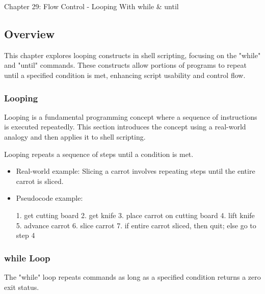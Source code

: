 \begin{notes}{Chapter 29: Flow Control - Looping With while \& until}
    \subsection*{Overview}

    This chapter explores looping constructs in shell scripting, focusing on the "while" and "until" commands. These constructs allow portions of programs to repeat until a specified condition is met, 
    enhancing script usability and control flow.
    
    \subsubsection*{Looping}
    
    Looping is a fundamental programming concept where a sequence of instructions is executed repeatedly. This section introduces the concept using a real-world analogy and then applies it to shell scripting.
    
    \begin{highlight}[Looping]
    
        Looping repeats a sequence of steps until a condition is met.
        
        \begin{itemize}
            \item Real-world example: Slicing a carrot involves repeating steps until the entire carrot is sliced.
            \item Pseudocode example:
    \begin{code}[Bash]
    1. get cutting board
    2. get knife
    3. place carrot on cutting board
    4. lift knife
    5. advance carrot
    6. slice carrot
    7. if entire carrot sliced, then quit; else go to step 4
    \end{code}
        \end{itemize}
    
    \end{highlight}
    
    \subsubsection*{while Loop}
    
    The "while" loop repeats commands as long as a specified condition returns a zero exit status.
    
    \begin{highlight}
    

\end{highlight}
\end{notes}

